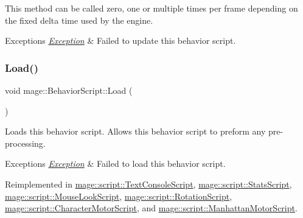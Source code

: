This method can be called zero, one or multiple times per frame depending on the fixed delta time used by the engine.


\begin{DoxyExceptions}{Exceptions}
{\em \hyperlink{classmage_1_1_exception}{Exception}} & Failed to update this behavior script. \\
\hline
\end{DoxyExceptions}
\hypertarget{classmage_1_1_behavior_script_a06521eef472f2d878a9f652b95b723a8}{}\label{classmage_1_1_behavior_script_a06521eef472f2d878a9f652b95b723a8} 
\subsubsection{\texorpdfstring{Load()}{Load()}}
{\footnotesize\ttfamily void mage\+::\+Behavior\+Script\+::\+Load (\begin{DoxyParamCaption}{ }\end{DoxyParamCaption})\hspace{0.3cm}{\ttfamily [virtual]}}

Loads this behavior script. Allows this behavior script to preform any pre-\/processing.


\begin{DoxyExceptions}{Exceptions}
{\em \hyperlink{classmage_1_1_exception}{Exception}} & Failed to load this behavior script. \\
\hline
\end{DoxyExceptions}


Reimplemented in \hyperlink{classmage_1_1script_1_1_text_console_script_aaa7ab7c1859adc6532b6191c205d44ef}{mage\+::script\+::\+Text\+Console\+Script}, \hyperlink{classmage_1_1script_1_1_stats_script_aae0d11d30f1242d1f8d569b5b0894343}{mage\+::script\+::\+Stats\+Script}, \hyperlink{classmage_1_1script_1_1_mouse_look_script_a4b26f1ac71e89eaac7903101b95745e9}{mage\+::script\+::\+Mouse\+Look\+Script}, \hyperlink{classmage_1_1script_1_1_rotation_script_a7a632d323f57f4f2f19c0562bd0656e1}{mage\+::script\+::\+Rotation\+Script}, \hyperlink{classmage_1_1script_1_1_character_motor_script_aa07409b305e1766b69134f7884be7395}{mage\+::script\+::\+Character\+Motor\+Script}, and \hyperlink{classmage_1_1script_1_1_manhattan_motor_script_aea733198d0f4b6e46815c3b91c3e8751}{mage\+::script\+::\+Manhattan\+Motor\+Script}.

\hypertarget{classmage_1_1_behavior_script_a0b3327ebf7009e668a7022d254cb1d51}{}\label{classmage_1_1_behavior_script_a0b3327ebf7009e668a7022d254cb1d51} 
